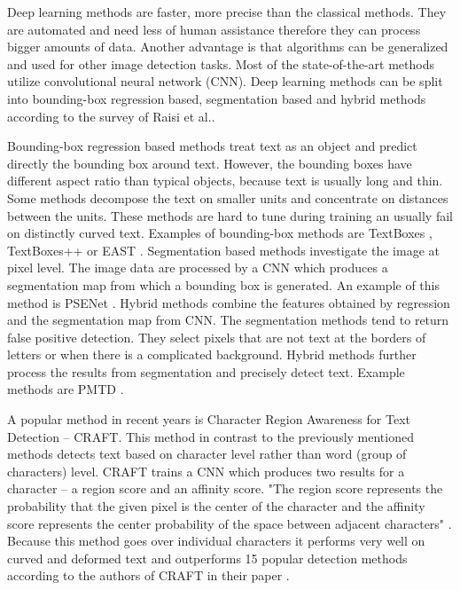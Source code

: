 Deep learning methods are faster, more precise than the classical methods. They are automated and need less of human assistance therefore they can process bigger amounts of data. Another advantage is that algorithms can be generalized and used for other image detection tasks. Most of the state-of-the-art methods utilize convolutional neural network (CNN). Deep learning methods can be split into bounding-box regression based, segmentation based and hybrid methods according to the survey of Raisi et al.\cite{raisi2020text}.

Bounding-box regression based methods treat text as an object and predict directly the bounding box around text. However, the bounding boxes have different aspect ratio than typical objects, because text is usually long and thin. Some methods decompose the text on smaller units and concentrate on distances between the units. These methods are hard to tune during training an usually fail on distinctly curved text. Examples of bounding-box methods are TextBoxes \cite{liao2017textboxes}, TextBoxes++ \cite{liao2018textboxes++} or EAST \cite{zhou2017east}. Segmentation based methods investigate the image at pixel level. The image data are processed by a CNN which produces a segmentation map from which a bounding box is generated. An example of this method is PSENet \cite{wang2019shape}. Hybrid methods combine the features obtained by regression and the segmentation map from CNN. The segmentation methods tend to return false positive detection. They select pixels that are not text at the borders of letters or when there is a complicated background. Hybrid methods further process the results from segmentation and precisely detect text. Example methods are PMTD \cite{liu2019pyramid}.

A popular method in recent years is Character Region Awareness for Text Detection -- CRAFT. This method in contrast to the previously mentioned methods detects text based on character level rather than word (group of characters) level. CRAFT trains a CNN which produces two results for a character -- a region score and an affinity score. "The region score represents the probability that the given pixel is the center of the character and the affinity score represents the center probability of the space between adjacent characters" \cite[page 3]{craft2}. Because this method goes over individual characters it performs very well on curved and deformed text and outperforms 15 popular detection methods according to the authors of CRAFT in their paper \cite{craft2}.


